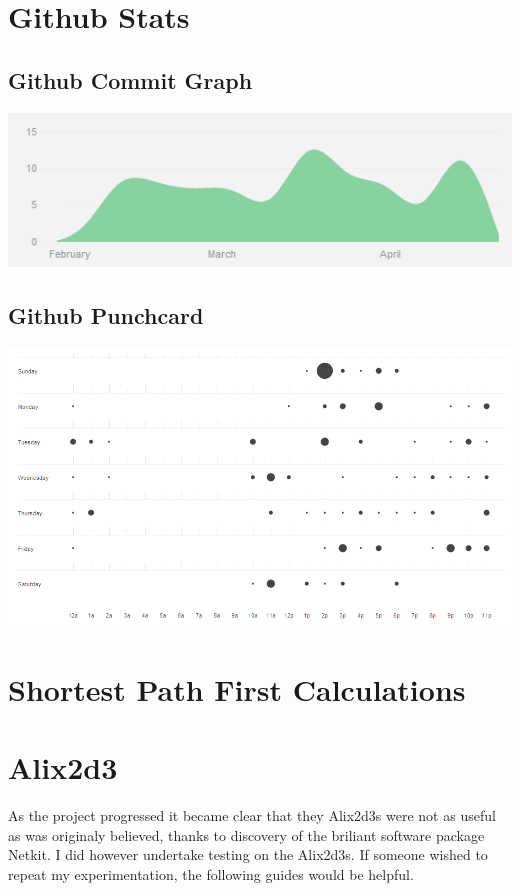 \chapter{Github Stats}
\label{GithubStats}

\section{Github Commit Graph}
\begin{center}
	\includegraphics[width=\linewidth]{../Diagrams/Stats/GitHubCommitGraph.png}
\end{center}

\section{Github Punchcard}
\begin{center}
	\includegraphics[width=\linewidth]{../Diagrams/Stats/GitHubPunchCard.png}
\end{center}

\chapter{Shortest Path First Calculations}
\label{dijkstra}


\chapter{Alix2d3}
As the project progressed it became clear that they Alix2d3s were not as useful
as was originaly believed, thanks to discovery of the briliant software package
Netkit. I did however undertake testing on the Alix2d3s. If someone wished to
repeat my experimentation, the following guides would be helpful. 

